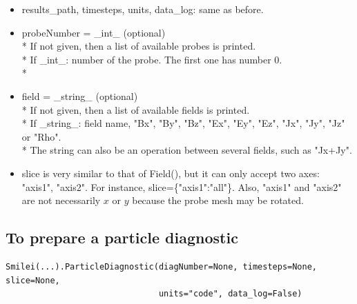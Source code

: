 \documentclass[11pt]{article}
\newcommand{\code}[1]{\colorbox{yellow!15}{\ttfamily #1}}
\begin{document}
\begin{itemize}
\item \code{results\_path}, \code{timesteps}, \code{units}, \code{data\_log}: same as before.
\item \code{probeNumber} = \code{\_int\_} (optional)\\*
	If not given, then a list of available probes is printed.\\*
	If \code{\_int\_}: number of the probe. The first one has number 0.\\*
\item \code{field} = \code{\_string\_} (optional)\\*
	If not given, then a list of available fields is printed.\\*
	If \code{\_string\_}: field name, \code{"Bx"}, \code{"By"}, \code{"Bz"}, \code{"Ex"}, \code{"Ey"}, \code{"Ez"}, \code{"Jx"}, \code{"Jy"}, \code{"Jz"} or \code{"Rho"}.\\*
	The string can also be an operation between several fields, such as \code{"Jx+Jy"}.
\item \code{slice} is very similar to that of \code{Field()}, but it can only accept two axes: \code{"axis1"}, \code{"axis2"}.
	For instance, \code{slice=\{"axis1":"all"\}}. Also, \code{"axis1"} and \code{"axis2"} are not necessarily $x$ or $y$ because the probe mesh may be rotated.
\end{itemize}
\vspace{0.5cm}


\subsection{To prepare a particle diagnostic}

\begin{lstlisting}
Smilei(...).ParticleDiagnostic(diagNumber=None, timesteps=None, slice=None,
                               units="code", data_log=False)
\end{lstlisting}
\end{document}
